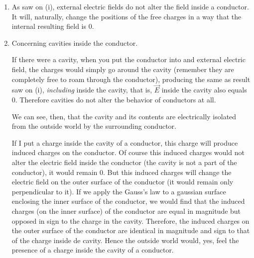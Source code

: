 \documentclass[oneside, 12pt, notitlepage]{book}
\begin{document}
\begin{enumerate}
    \item As saw on (i), external electric fields do not alter the field inside a conductor. It will, naturally, change the positions of the free charges in a way that the internal resulting field is $0$.
    \item Concerning cavities inside the conductor. \par
    If there were a cavity, when you put the conductor into and external electric field, the charges would simply go around the cavity (remember they are completely free to roam through the conductor), producing the same as result saw on (i), \textit{including} inside the cavity, that is, $\vec{E}$ inside the cavity also equals $0$. Therefore cavities do not alter the behavior of conductors at all.\par
    We can see, then, that the cavity and its contents are electrically isolated from the outside world by the surrounding conductor.\par
    If I put a charge inside the cavity of a conductor, this charge will produce induced charges on the conductor. Of course this induced charges would not alter the electric field inside the conductor (the cavity is not a part of the conductor), it would remain $0$. But this induced charges will change the electric field on the outer surface of the conductor (it would remain only perpendicular to it). If we apply the Gauss's law to a gaussian surface enclosing the inner surface of the conductor, we would find that the induced charges (on the inner surface) of the conductor are equal in magnitude but opposed in sign to the charge in the cavity. Therefore, the induced charges on the outer surface of the conductor are identical in magnitude and sign to that of the charge inside de cavity. Hence the outside world would, yes, feel the presence of a charge inside the cavity of a conductor.
\end{enumerate}
\end{document}
